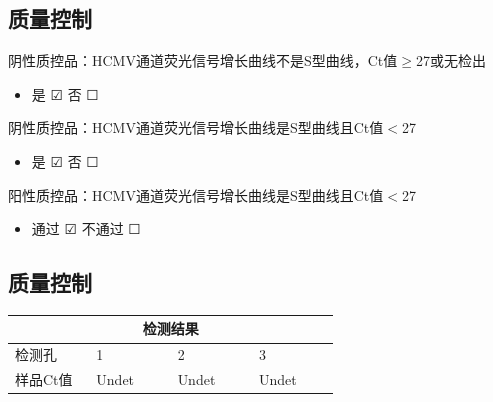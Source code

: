 \documentclass[UTF8,10pt,a4paper,fontset=fandol]{ctexart}
\newcommand{\fieldvalue}[1]{#1}
\newcommand{\handwritten}[1]{#1}
\newcommand{\checkboxfield}[1]{\ifstrequal{#1}{checked}{☑}{\ifstrequal{#1}{unclear}{?}{☐}}}
\begin{document}
\subsection{质量控制}

\noindent
阴性质控品：HCMV通道荧光信号增长曲线不是S型曲线，Ct值$\geq$27或无检出

\begin{itemize}
\item 是
\fieldvalue{\checkboxfield{checked}}
\quad 否
\fieldvalue{\checkboxfield{unchecked}}
\end{itemize}

\noindent
阴性质控品：HCMV通道荧光信号增长曲线是S型曲线且Ct值$<$27

\begin{itemize}
\item 是
\fieldvalue{\checkboxfield{checked}}
\quad 否
\fieldvalue{\checkboxfield{unchecked}}
\end{itemize}

\noindent
阳性质控品：HCMV通道荧光信号增长曲线是S型曲线且Ct值$<$27

\begin{itemize}
\item 通过
\fieldvalue{\checkboxfield{checked}}
\quad 不通过
\fieldvalue{\checkboxfield{unchecked}}
\end{itemize}

\subsection{质量控制}

\begin{tabular}{|p{0.22\linewidth}|p{0.22\linewidth}|p{0.22\linewidth}|p{0.22\linewidth}|}
\hline
\multicolumn{4}{|c|}{检测结果} \\
\hline
检测孔 & 1 & 2 & 3 \\
\hline
样品Ct值 &
\fieldvalue{\handwritten{Undet}} &
\fieldvalue{\handwritten{Undet}} &
\fieldvalue{\handwritten{Undet}} \\
\hline
\end{tabular}
\end{document}
